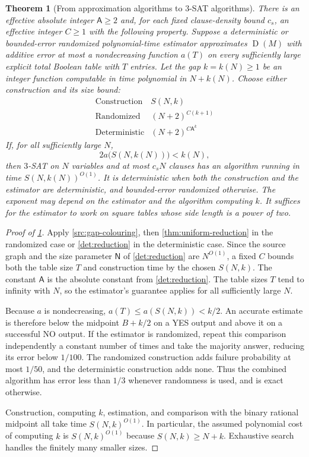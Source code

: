 \documentclass[11pt,letterpaper]{article} \usepackage[utf8]{inputenc}
\theoremstyle{plain} \newtheorem{theorem}{Theorem}[section]
\theoremstyle{definition} \newaliascnt{definition}{theorem}
\newcommand{\D}{\operatorname{D}}
\begin{document}
\begin{theorem}[From approximation algorithms to $3$-SAT algorithms]
\label{thm:time-tradeoff}
There is an effective absolute integer $\mathsf A\ge2$ and, for each fixed
clause-density bound $c_s$, an effective integer $C\ge1$ with the following
property. Suppose a deterministic or
bounded-error randomized polynomial-time estimator approximates $\D(M)$
with additive error at most a nondecreasing function $a(T)$ on every
sufficiently large explicit total Boolean table with $T$ entries.
Let the gap $k=k(N)\ge1$ be an integer function computable in time polynomial in
$N+k(N)$. Choose either construction and its size bound:
\[
\begin{array}{c|c}
\text{Construction} & S(N,k)\\ \hline
\text{Randomized} & (N+2)^{C(k+1)}\\[2pt]
\text{Deterministic} & (N+2)^{C\mathsf A^k}
\end{array}
\]
If, for all sufficiently large $N$,
\[
2a\bigl(S(N,k(N))\bigr)<k(N),
\]
then $3$-SAT on $N$ variables and at most $c_sN$ clauses has an algorithm
running in time $S(N,k(N))^{O(1)}$. It is deterministic when both the
construction and the estimator are deterministic, and bounded-error
randomized otherwise. The exponent may depend on the estimator and the
algorithm computing $k$. It suffices for the estimator to work on square
tables whose side length is a power of two.
\end{theorem}

\begin{proof}[Proof of \cref{thm:time-tradeoff}]
\label{proof:thm:time-tradeoff}
Apply \cref{src:gap-colouring}, then \cref{thm:uniform-reduction} in the
randomized case or \cref{det:reduction} in the deterministic case. Since
the source graph and the size parameter $\mathsf N$ of \cref{det:reduction} are $N^{O(1)}$, a
fixed $C$ bounds both the table size $T$ and construction time by the
chosen $S(N,k)$. The constant $\mathsf A$ is the absolute constant from
\cref{det:reduction}. The table sizes $T$ tend to infinity with $N$, so the estimator's guarantee applies for all sufficiently large $N$.

Because $a$ is nondecreasing, $a(T)\le a(S(N,k))<k/2$. An accurate
estimate is therefore below the midpoint $B+k/2$ on a YES output and
above it on a successful NO output. If the estimator is randomized,
repeat this comparison independently a constant number of times and take
the majority answer, reducing its error below $1/100$. The randomized
construction adds failure probability at most $1/50$, and the deterministic
construction adds none. Thus the combined algorithm has error less than
$1/3$ whenever randomness is used, and is exact otherwise.

Construction, computing $k$, estimation, and comparison with the binary
rational midpoint all take time $S(N,k)^{O(1)}$. In particular, the assumed polynomial cost of computing $k$
is $S(N,k)^{O(1)}$ because $S(N,k)\ge N+k$.
Exhaustive search handles the finitely many smaller sizes.
\end{proof}
\end{document}
